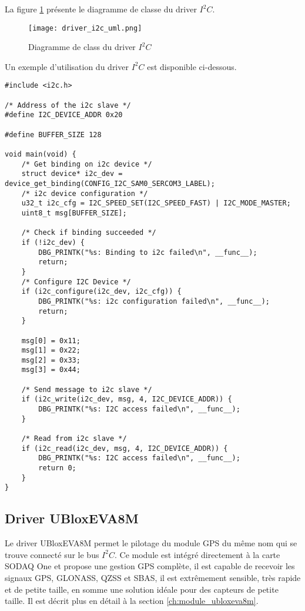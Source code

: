 La figure \ref{fig:driver_i2c_uml} présente le diagramme de classe du driver $I^{2}C$.

\begin{figure}[htb]
\centering 
\texttt{[image: driver\_i2c\_uml.png]} 
\caption{Diagramme de class du driver $I^{2}C$}
\label{fig:driver_i2c_uml}
\end{figure}

Un exemple d'utilisation du driver $I^{2}C$ est disponible ci-dessous.

\begin{lstlisting}[style=CStyle]
#include <i2c.h>

/* Address of the i2c slave */
#define I2C_DEVICE_ADDR 0x20

#define BUFFER_SIZE 128

void main(void) {
	/* Get binding on i2c device */
	struct device* i2c_dev = device_get_binding(CONFIG_I2C_SAM0_SERCOM3_LABEL);
	/* i2c device configuration */
	u32_t i2c_cfg = I2C_SPEED_SET(I2C_SPEED_FAST) | I2C_MODE_MASTER;
	uint8_t msg[BUFFER_SIZE];
	
	/* Check if binding succeeded */
	if (!i2c_dev) {
		DBG_PRINTK("%s: Binding to i2c failed\n", __func__);
		return;
	}
	/* Configure I2C Device */
	if (i2c_configure(i2c_dev, i2c_cfg)) {
		DBG_PRINTK("%s: i2c configuration failed\n", __func__);
		return;
	}	
	
	msg[0] = 0x11;
	msg[1] = 0x22;
	msg[2] = 0x33;
	msg[3] = 0x44;	
	
	/* Send message to i2c slave */
	if (i2c_write(i2c_dev, msg, 4, I2C_DEVICE_ADDR)) {
		DBG_PRINTK("%s: I2C access failed\n", __func__);
	}
	
	/* Read from i2c slave */
	if (i2c_read(i2c_dev, msg, 4, I2C_DEVICE_ADDR)) {
		DBG_PRINTK("%s: I2C access failed\n", __func__);
		return 0;
	}	
}
\end{lstlisting}

\subsection{Driver UBloxEVA8M}

Le driver UBloxEVA8M permet le pilotage du module GPS du même nom qui se trouve connecté sur le bus $I^{2}C$. Ce module est intégré directement à la carte SODAQ One et propose une gestion GPS complète, il est capable de recevoir les signaux GPS, GLONASS, QZSS et SBAS, il est extrêmement sensible, très rapide et de petite taille, en somme une solution idéale pour des capteurs de petite taille. Il est décrit plus en détail à la section \ref{ch:module_ubloxeva8m}. 

